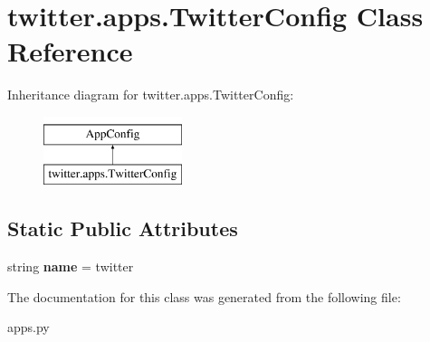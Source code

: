 \hypertarget{classtwitter_1_1apps_1_1_twitter_config}{}\section{twitter.\+apps.\+Twitter\+Config Class Reference}
\label{classtwitter_1_1apps_1_1_twitter_config}
Inheritance diagram for twitter.\+apps.\+Twitter\+Config\+:\begin{figure}[H]
\begin{center}
\leavevmode
\includegraphics[height=2.000000cm]{classtwitter_1_1apps_1_1_twitter_config}
\end{center}
\end{figure}
\subsection*{Static Public Attributes}
\begin{DoxyCompactItemize}
\item 
\mbox{\label{classtwitter_1_1apps_1_1_twitter_config_ad6fa8da3b1d7a28a13a3a1430d9ad93f}} 
string {\bfseries name} = \textquotesingle{}twitter\textquotesingle{}
\end{DoxyCompactItemize}


The documentation for this class was generated from the following file\+:\begin{DoxyCompactItemize}
\item 
apps.\+py\end{DoxyCompactItemize}
